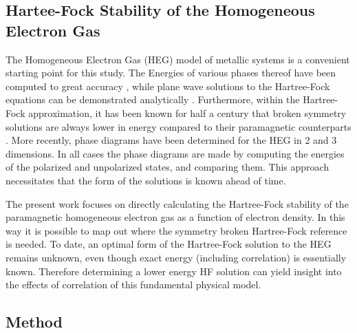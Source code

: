 \documentclass{revtex4}
\begin{document}
    \subsection{Hartee-Fock Stability of the Homogeneous Electron Gas}
    
    The Homogeneous Electron Gas (HEG) model of metallic systems is a convenient starting point 
    for 
    this study. The Energies of various phases thereof have been computed to great accuracy
    \cite{Ceperley1980}, while plane wave solutions to the Hartree-Fock equations can be 
    demonstrated analytically \cite{Phillips2012}. Furthermore, within the Hartree-Fock 
    approximation, it has been known for half a century that broken symmetry solutions are always 
    lower in energy compared to their paramagnetic counterparts \cite{Overhauser1962}. More 
    recently, phase diagrams have been determined for the 
    HEG in 2 and 3 dimensions\cite{Delyon2008}\cite{Bernu2011}\cite{Baguet2013}. In all cases the 
    phase diagrams are made by computing the energies of the polarized and unpolarized states, and 
    comparing them. This approach necessitates that the form of the solutions is known ahead of 
    time. 
    
    The present work focuses on directly calculating the Hartree-Fock stability of 
    the 
    paramagnetic homogeneous electron gas as a function of electron density. In this way it is 
    possible to map out where the symmetry broken Hartree-Fock reference is needed. To date, an 
    optimal form of the Hartree-Fock solution to the HEG remains unknown, even though exact energy 
    (including correlation) is essentially known. Therefore determining a lower energy HF solution 
    can yield insight into the effects of correlation of this fundamental physical model. 
    	
  \subsection{Method}
\end{document}
